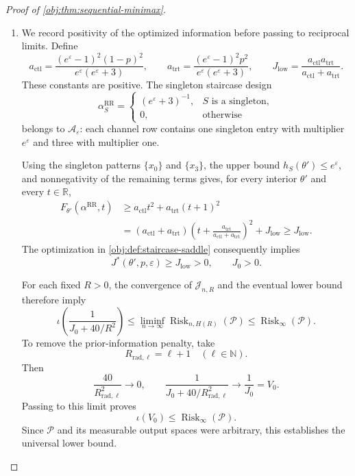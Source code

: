 \begin{proof}[Proof of \cref{obj:thm:sequential-minimax}]
\begin{enumerate}
\item
We record positivity of the optimized information before passing to reciprocal limits. Define
\[
a_{\mathrm{ctl}}
=
\frac{(e^\varepsilon-1)^2(1-p)^2}
{e^\varepsilon(e^\varepsilon+3)},
\qquad
a_{\mathrm{trt}}
=
\frac{(e^\varepsilon-1)^2p^2}
{e^\varepsilon(e^\varepsilon+3)},
\qquad
J_{\mathrm{low}}
=
\frac{a_{\mathrm{ctl}}a_{\mathrm{trt}}}
{a_{\mathrm{ctl}}+a_{\mathrm{trt}}}.
\]
These constants are positive. The singleton staircase design
\[
\alpha^{\mathrm{RR}}_S
=
\begin{cases}
(e^\varepsilon+3)^{-1},&S\text{ is a singleton},\\
0,&\text{otherwise}
\end{cases}
\]
belongs to \(\mathcal A_\varepsilon\): each channel row contains one singleton entry with multiplier \(e^\varepsilon\) and three with multiplier one.

Using the singleton patterns \(\{x_0\}\) and \(\{x_3\}\), the upper bound \(h_S(\theta')\le e^\varepsilon\), and nonnegativity of the remaining terms gives, for every interior \(\theta'\) and every \(t\in\mathbb R\),
\[
\begin{aligned}
F_{\theta'}(\alpha^{\mathrm{RR}},t)
&\ge
a_{\mathrm{ctl}}t^2+a_{\mathrm{trt}}(t+1)^2\\
&=
(a_{\mathrm{ctl}}+a_{\mathrm{trt}})
\left(t+\frac{a_{\mathrm{trt}}}
{a_{\mathrm{ctl}}+a_{\mathrm{trt}}}\right)^2
+J_{\mathrm{low}}
\ge J_{\mathrm{low}}.
\end{aligned}
\]
The optimization in \cref{obj:def:staircase-saddle} consequently implies
\[
J^*(\theta',p,\varepsilon)\ge J_{\mathrm{low}}>0,
\qquad
J_0>0.
\]

For each fixed \(R>0\), the convergence of \(\mathcal J_{n,R}\) and the eventual lower bound therefore imply
\[
\iota\!\left(\frac1{J_0+40/R^2}\right)
\le
\liminf_{n\to\infty}
\operatorname{Risk}_{n,H(R)}(\mathcal P)
\le
\operatorname{Risk}_{\infty}(\mathcal P).
\]
To remove the prior-information penalty, take
\[
R_{\mathrm{rad},\ell}=\ell+1\quad(\ell\in\mathbb N).
\]
Then
\[
\frac{40}{R_{\mathrm{rad},\ell}^2}\longrightarrow0,
\qquad
\frac1{J_0+40/R_{\mathrm{rad},\ell}^2}\longrightarrow\frac1{J_0}=V_0.
\]
Passing to this limit proves
\[
\iota(V_0)\le\operatorname{Risk}_{\infty}(\mathcal P).
\]
Since \(\mathcal P\) and its measurable output spaces were arbitrary, this establishes the universal lower bound.


\end{enumerate}
\end{proof}
